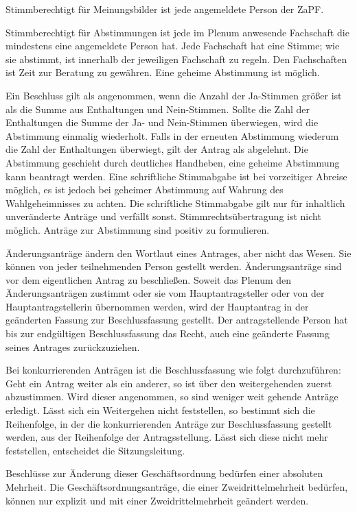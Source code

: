 \documentclass[12pt,oneside]{scrartcl}
\begin{document}
\begin{list}{.}
{
\addtocounter{listcnt0}{1}
\setlength{\rightmargin}{\leftmargin}
}

\item Stimmberechtigt für Meinungsbilder ist jede angemeldete Person der ZaPF.

\item Stimmberechtigt für Abstimmungen ist jede im Plenum anwesende Fachschaft
die mindestens eine angemeldete Person hat.
Jede Fachschaft hat eine Stimme; wie sie abstimmt, ist innerhalb der
jeweiligen Fachschaft zu regeln.
Den Fachschaften ist Zeit zur Beratung zu gewähren.
Eine geheime Abstimmung ist möglich.

\item Ein Beschluss gilt als angenommen, wenn die Anzahl der Ja-Stimmen größer
ist als die Summe aus Enthaltungen und Nein-Stimmen.
Sollte die Zahl der Enthaltungen die Summe der Ja- und Nein-Stimmen
überwiegen, wird die Abstimmung einmalig wiederholt.
Falls in der erneuten Abstimmung wiederum die Zahl der Enthaltungen
überwiegt, gilt der Antrag als abgelehnt.
Die Abstimmung geschieht durch deutliches Handheben, eine geheime
Abstimmung kann beantragt werden.
Eine schriftliche Stimmabgabe ist bei vorzeitiger Abreise möglich, es ist
jedoch bei geheimer Abstimmung auf Wahrung des Wahlgeheimnisses zu achten.
Die schriftliche Stimmabgabe gilt nur für inhaltlich unveränderte Anträge
und verfällt sonst.
Stimmrechtsübertragung ist nicht möglich.
Anträge zur Abstimmung sind positiv zu formulieren.

\item Änderungsanträge ändern den Wortlaut eines Antrages, aber nicht das Wesen.
Sie können von jeder teilnehmenden Person gestellt werden.
Änderungsanträge sind vor dem eigentlichen Antrag zu beschließen.
Soweit das Plenum den Änderungsanträgen zustimmt oder sie vom
Hauptantragsteller oder von der Hauptantragstellerin übernommen werden,
wird der Hauptantrag in der geänderten Fassung zur Beschlussfassung gestellt.
Der antragstellende Person hat bis zur endgültigen Beschlussfassung das Recht,
auch eine geänderte Fassung seines Antrages zurückzuziehen.

\item Bei konkurrierenden Anträgen ist die Beschlussfassung wie folgt durchzuführen:
Geht ein Antrag weiter als ein anderer, so ist über den weitergehenden
zuerst abzustimmen.
Wird dieser angenommen, so sind weniger weit gehende Anträge erledigt.
Lässt sich ein Weitergehen nicht feststellen, so bestimmt sich die
Reihenfolge, in der die konkurrierenden Anträge zur Beschlussfassung
gestellt werden, aus der Reihenfolge der Antragsstellung.
Lässt sich diese nicht mehr feststellen, entscheidet die Sitzungsleitung.

\item Beschlüsse zur Änderung dieser Geschäftsordnung bedürfen einer absoluten
Mehrheit.
Die Geschäftsordnungsanträge, die einer Zweidrittelmehrheit bedürfen, können nur
explizit und mit einer Zweidrittelmehrheit geändert werden.
\end{list}
\end{document}
